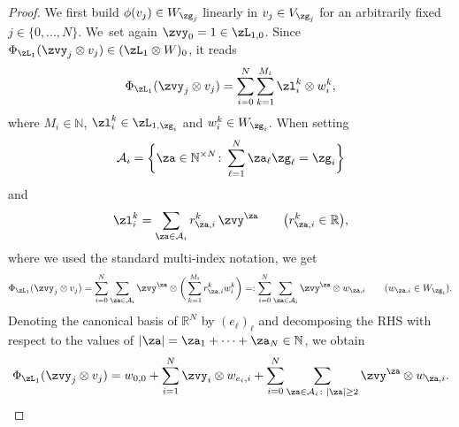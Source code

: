\documentclass[10pt,a4paper]{amsart}
\newcommand{\R}{{\mathbb R}}
\newcommand{\0}{\otimes}
\numberwithin{equation}{section}
\begin{document}
\begin{proof}
We first build $\phi(v_j)\in W_{\zg_j}$ linearly in $v_j\in V_{\zg_j}$ for an arbitrarily fixed $j\in\{0,\dots,N\}$. We~set again $\zvy_0=1\in\zL_{1,0}$. Since $\Phi_{\zL_1}(\zvy_j\0v_j)\in (\zL_1\0 W)_0$, it reads
\[
\Phi_{\zL_1}(\zvy_j\0v_j)=\sum_{i=0}^N\sum_{k=1}^{M_i} \zl_i^k\0 w_i^k,
\]
where $M_i\in \mathbb{N}$, $\zl_i^k\in\zL_{1,\zg_i}$ and $w_i^k\in W_{\zg_i}$. When setting
\[
\mathcal{A}_i=\bigg\{\za\in\mathbb{N}^{\times N}\colon \sum_{\ell=1}^N\za_\ell\zg_\ell=\zg_i\bigg\}
\]
and
\[
\zl_i^k=\sum_{\za\in\mathcal{A}_i}r_{\za,i}^k\,\zvy^\za\qquad\big(r_{\za,i}^k\in\R\big),
\]
where we used the standard multi-index notation, we get
\[
\Phi_{\zL_1}(\zvy_j\0v_j)=\sum_{i=0}^N\sum_{\za\in\mathcal{A}_i}\zvy^\za\0\bigg(\sum_{k=1}^{M_i}r_{\za,i}^k w_i^k\bigg)=:\sum_{i=0}^N\sum_{\za\in\mathcal{A}_i}\zvy^\za\0 w_{\za,i}\qquad
(w_{\za,i}\in W_{\zg_i}).
\]
Denoting the canonical basis of $\R^N$ by $(e_\ell)_\ell$ and decomposing the {\small RHS} with respect to the values of $|\za|=\za_1+\dots+\za_N\in\mathbb{N}$, we obtain
\begin{gather}\label{Defphi1}
\Phi_{\zL_1}(\zvy_j\0v_j)=w_{0,0}+\sum_{i=1}^N \zvy_i\0 w_{e_i,i}+\sum_{i=0}^N\sum_{\za\in\mathcal{A}_i\colon |\za|\ge 2}\zvy^\za\0 w_{\za,i}.
\end{gather}


\end{proof}
\end{document}
